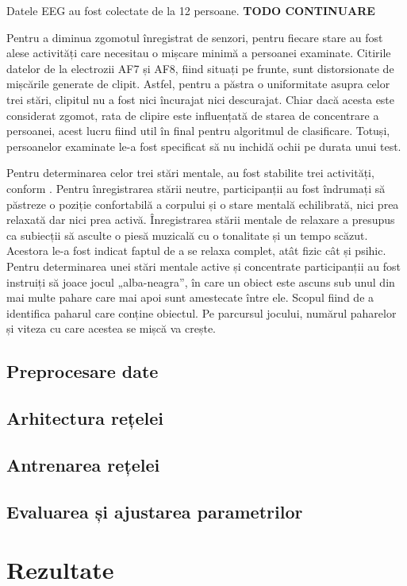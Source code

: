 Datele EEG au fost colectate de la 12 persoane. \textbf{TODO CONTINUARE}

Pentru a diminua zgomotul înregistrat de senzori, pentru fiecare stare au fost alese activități care necesitau o mișcare minimă a persoanei examinate. Citirile datelor de la electrozii AF7 și AF8, fiind situați pe frunte, sunt distorsionate de mișcările generate de clipit. Astfel, pentru a păstra o uniformitate asupra celor trei stări, clipitul nu a fost nici încurajat nici descurajat. Chiar dacă acesta este considerat zgomot, rata de clipire este influențată de starea de concentrare a persoanei, acest lucru fiind util în final pentru algoritmul de clasificare. Totuși, persoanelor examinate le-a fost specificat să nu inchidă ochii pe durata unui test.

Pentru determinarea celor trei stări mentale, au fost stabilite trei activități, conform \cite{eeg:2018}. Pentru înregistrarea stării neutre, participanții au fost îndrumați să păstreze o poziție confortabilă a corpului și o stare mentală echilibrată, nici prea relaxată dar nici prea activă. Înregistrarea stării mentale de relaxare a presupus ca subiecții să asculte o piesă muzicală cu o tonalitate și un tempo scăzut. Acestora le-a fost indicat faptul de a se relaxa complet, atât fizic cât și psihic. Pentru determinarea unei stări mentale active și concentrate participanții au fost instruiți să joace jocul „alba-neagra”, în care un obiect este ascuns sub unul din mai multe pahare care mai apoi sunt amestecate între ele. Scopul fiind de a identifica paharul care conține obiectul. Pe parcursul jocului, numărul paharelor și viteza cu care acestea se mișcă va crește.

\subsection{Preprocesare date}

\subsection{Arhitectura rețelei}

\subsection{Antrenarea rețelei}

\subsection{Evaluarea și ajustarea parametrilor}

\section{Rezultate}

